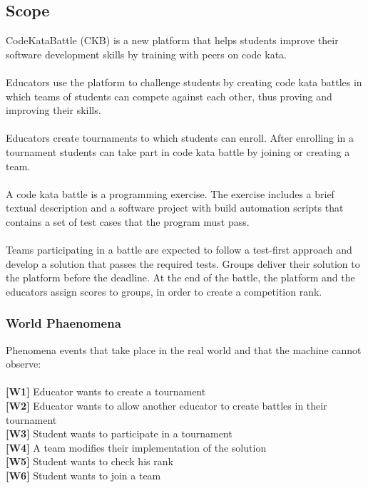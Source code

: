 \documentclass{article}
\begin{document}
\subsection{Scope}
CodeKataBattle (CKB) is a new platform that helps students improve their software development skills by training with peers on code kata. 
\\\\
Educators use the platform to challenge students by creating code kata battles in which teams of students can compete against each other, thus proving and improving their skills. 
\\\\
Educators create tournaments to which students can enroll. After enrolling in a tournament students can take part in code kata battle by joining or creating a team.
\\\\
A code kata battle is a programming exercise.
The exercise includes a brief textual description and a software project with build automation scripts that contains a set of test cases that the program must pass.
\\\\
Teams participating in a battle are expected to follow a test-first approach and develop a solution that passes the required tests. Groups deliver their solution to the platform before the deadline.
At the end of the battle, the platform and the educators assign scores to groups, in order to create a competition rank.
\subsubsection{World Phaenomena}
Phenomena events that take place in the real world and that the machine cannot observe:\\\\
\textbf{[W1]} Educator wants to create a tournament\\
\textbf{[W2]} Educator wants to allow another educator to create battles in their tournament\\
\textbf{[W3]} Student wants to participate in a tournament\\
\textbf{[W4]} A team modifies their implementation of the solution\\
\textbf{[W5]} Student wants to check his rank\\
\textbf{[W6]} Student wants to join a team\\
\end{document}
